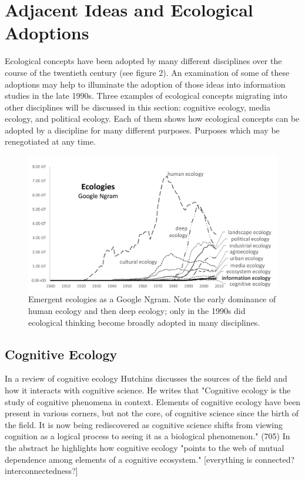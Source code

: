 \section{Adjacent Ideas and Ecological Adoptions}

Ecological concepts have been adopted by many different disciplines over the course of the twentieth century (see figure 2). An examination of some of these adoptions may help to illuminate the adoption of those ideas into information studies in the late 1990s. Three examples of ecological concepts migrating into other disciplines will be discussed in this section: cognitive ecology, media ecology, and political ecology. Each of them shows how ecological concepts can be adopted by a discipline for many different purposes. Purposes which may be renegotiated at any time.

\begin{figure}[!ht]
  \centering
    \includegraphics[width=5.5in]{figures/ecologiesAll}
  \caption{Emergent ecologies as a Google Ngram. Note the early dominance of human ecology and then deep ecology; only in the 1990s did ecological thinking become broadly adopted in many disciplines.}
\end{figure}

\subsection{Cognitive Ecology}

In a review of cognitive ecology Hutchins \citep{hutchins_cognitive_2010} discusses the sources of the field and how it interacts with cognitive science. He writes that "Cognitive ecology is the study of cognitive phenomena in context. Elements of cognitive ecology have been present in various corners, but not the core, of cognitive science since the birth of the field. It is now being rediscovered as cognitive science shifts from viewing cognition as a logical process to seeing it as a biological phenomenon." (705) In the abstract he highlights how cognitive ecology "points to the web of mutual dependence among elements of a cognitive ecosystem." [everything is connected? interconnectedness?]

